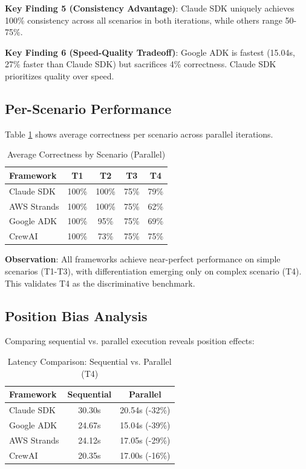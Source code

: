 \documentclass[sigconf,nonacm]{acmart}
\begin{document}
\textbf{Key Finding 5 (Consistency Advantage)}: Claude SDK uniquely achieves 100\% consistency across all scenarios in both iterations, while others range 50-75\%.

\textbf{Key Finding 6 (Speed-Quality Tradeoff)}: Google ADK is fastest (15.04s, 27\% faster than Claude SDK) but sacrifices 4\% correctness. Claude SDK prioritizes quality over speed.

\subsection{Per-Scenario Performance}

Table \ref{tab:per-scenario} shows average correctness per scenario across parallel iterations.

\begin{table}[h]
\caption{Average Correctness by Scenario (Parallel)}
\label{tab:per-scenario}
\begin{tabular}{lcccc}
\toprule
\textbf{Framework} & \textbf{T1} & \textbf{T2} & \textbf{T3} & \textbf{T4} \\
\midrule
Claude SDK & 100\% & 100\% & 75\% & 79\% \\
AWS Strands & 100\% & 100\% & 75\% & 62\% \\
Google ADK & 100\% & 95\% & 75\% & 69\% \\
CrewAI & 100\% & 73\% & 75\% & 75\% \\
\bottomrule
\end{tabular}
\end{table}

\textbf{Observation}: All frameworks achieve near-perfect performance on simple scenarios (T1-T3), with differentiation emerging only on complex scenario (T4). This validates T4 as the discriminative benchmark.

\subsection{Position Bias Analysis}

Comparing sequential vs. parallel execution reveals position effects:

\begin{table}[h]
\caption{Latency Comparison: Sequential vs. Parallel (T4)}
\label{tab:position-bias}
\begin{tabular}{lcc}
\toprule
\textbf{Framework} & \textbf{Sequential} & \textbf{Parallel} \\
\midrule
Claude SDK & 30.30s & 20.54s (-32\%) \\
Google ADK & 24.67s & 15.04s (-39\%) \\
AWS Strands & 24.12s & 17.05s (-29\%) \\
CrewAI & 20.35s & 17.00s (-16\%) \\
\bottomrule
\end{tabular}
\end{table}
\end{document}
